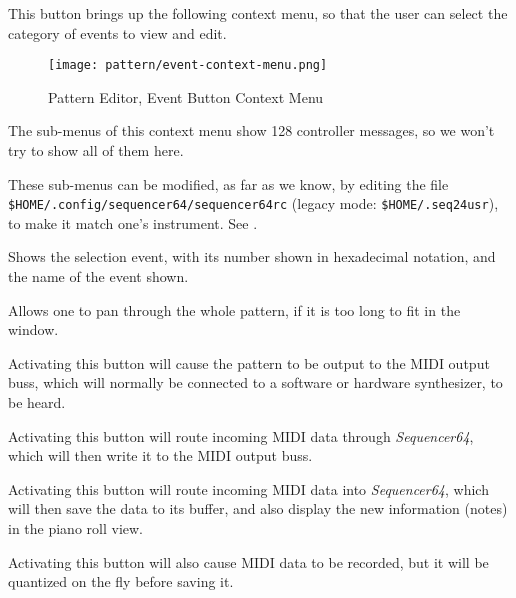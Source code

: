    \setcounter{ItemCounter}{0}      %

   This button brings up the following context menu, so that the user can
   select the category of events to view and edit.

\begin{figure}[H]
   \centering 
   \texttt{[image: pattern/event-context-menu.png]}
   \caption{Pattern Editor, Event Button Context Menu}
   \label{fig:pattern_editor_bottom_event_context_menu}
\end{figure}

   The sub-menus of this context menu show 128 controller messages,
   so we won't try to show all of them here.

   These sub-menus can be modified, as far as we know, by editing
   the file \texttt{\$HOME/.config/sequencer64/sequencer64rc}
   (legacy mode: \texttt{\$HOME/.seq24usr}), to make it match one's
   instrument.  See .

   Shows the selection event, with its number shown in hexadecimal notation,
   and the name of the event shown.

   Allows one to pan through the whole pattern, if it is too long to fit in
   the window.

   Activating this button will cause the pattern to be output to the MIDI
   output buss, which will normally be connected to a software or hardware
   synthesizer, to be heard.

   Activating this button will route incoming MIDI data through
   \textsl{Sequencer64}, which will then write it to the MIDI output buss.

   Activating this button will route incoming MIDI data into
   \textsl{Sequencer64}, which will then save the data to its buffer, and also
   display the new information (notes) in the piano roll view.

   Activating this button will also cause MIDI data to be recorded, but it
   will be quantized on the fly before saving it.

